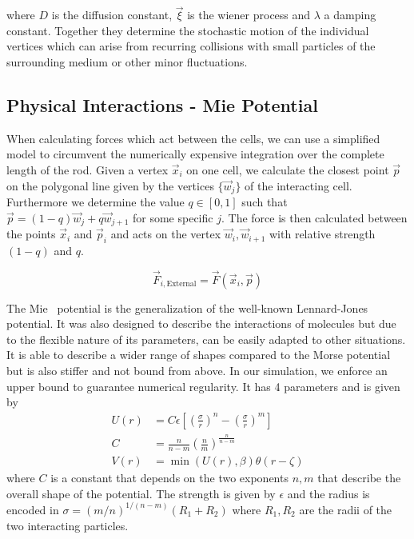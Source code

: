 \documentclass{article}
\begin{document}
where $D$ is the diffusion constant, $\vec{\xi}$ is the wiener process and $\lambda$ a damping
constant.
Together they determine the stochastic motion of the individual vertices which can arise from
recurring collisions with small particles of the surrounding medium or other minor fluctuations.

\subsection{Physical Interactions - Mie Potential}

When calculating forces which act between the cells, we can use a simplified model to circumvent the
numerically expensive integration over the complete length of the rod.
Given a vertex $\vec{x}_i$ on one cell, we calculate the closest point $\vec{p}$ on the polygonal
line given by the vertices $\{\vec{w}_j\}$ of the interacting cell.
Furthermore we determine the value $q\in[0,1]$ such that $\vec{p} = (1-q)\vec{w}_j + q\vec{w}_{j+1}$
for some specific $j$.
The force is then calculated between the points $\vec{x}_i$ and $\vec{p}_i$ and acts on
the vertex $\vec{w}_i,\vec{w}_{i+1}$ with relative strength $(1-q)$ and $q$.

\begin{equation}
    \vec{F}_{i,\text{External}} = \vec{F}(\vec{x}_i,\vec{p})
\end{equation}

The Mie~\cite{Mie1903} potential is the generalization of the well-known
Lennard-Jones~\cite{Jones1924} potential.
It was also designed to describe the interactions of molecules but due to the flexible nature of its
parameters, can be easily adapted to other situations.
It is able to describe a wider range of shapes compared to the Morse potential but is also stiffer
and not bound from above.
In our simulation, we enforce an upper bound to guarantee numerical regularity.
It has 4 parameters and is given by
\begin{align}
    U(r) &= C\epsilon\left[ \left(\frac{\sigma}{r}\right)^n -
        \left(\frac{\sigma}{r}\right)^m\right]\\
    C &= \frac{n}{n-m}\left(\frac{n}{m}\right)^{\frac{n}{n-m}}\\
    V(r) &= \min(U(r), \beta)\theta(r-\zeta)
\end{align}
where $C$ is a constant that depends on the two exponents $n,m$ that describe the overall shape of
the potential.
The strength is given by $\epsilon$ and the radius is encoded in $\sigma =
(m/n)^{1/(n-m)}(R_1+R_2)$ where $R_1,R_2$ are the radii of the two interacting particles.
\end{document}
